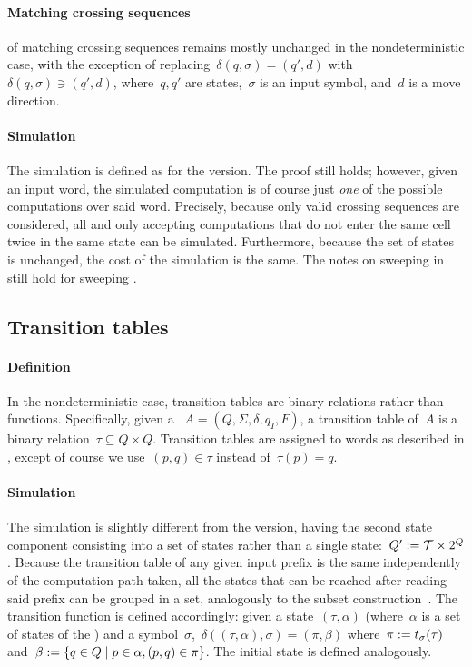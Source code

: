 \paragraph{Matching crossing sequences}  of matching crossing sequences remains mostly unchanged in the nondeterministic case, with the exception of replacing~$\delta(q,\sigma)=(q',d)$ with~$\delta(q,\sigma)\ni(q',d)$, where~$q,q'$ are states,~$\sigma$ is an input symbol, and~$d$ is a move direction.

\paragraph{Simulation} The simulation is defined as for the \TDFA version.
The proof still holds; however, given an input word, the simulated computation is of course just \emph{one} of the possible computations over said word.
Precisely, because only valid crossing sequences are considered, all and only accepting computations that do not enter the same cell twice in the same state can be simulated.
Furthermore, because the set of states is unchanged, the cost of the simulation is the same.
The notes on sweeping \TDFAs in  still hold for sweeping \TNFAs.


\easteregg{\thispagestyle{42}} %
\subsection{Transition tables}

\paragraph{Definition} In the nondeterministic case, transition tables are binary relations rather than functions.
Specifically, given a \TNFA~$A=(Q,\Sigma,\delta,q_I,F)$, a transition table of~$A$ is a binary relation~$\tau\subseteq Q\times Q$.
Transition tables are assigned to words as described in , except of course we use~$(p,q)\in\tau$ instead of~$\tau(p)=q$.

\paragraph{Simulation} The simulation is slightly different from the \TDFA version, having the second state component consisting into a set of states rather than a single state:~$Q':=\mathcal T\times2^{Q}$.
Because the transition table of any given input prefix is the same independently of the computation path taken, all the states that can be reached after reading said prefix can be grouped in a set, analogously to the subset construction~\cite{RabSco59,HopUll79}.
The transition function is defined accordingly: given a state~$(\tau,\alpha)$ (where~$\alpha$ is a set of states of the \TNFA) and a symbol~$\sigma$,~$\delta((\tau,\alpha),\sigma)=(\pi,\beta)$ where~$\pi:=t_\sigma(\tau)$ and~$\beta:=\{q\in Q\mid p\in\alpha, (p,q)\in\pi\}$.
The initial state is defined analogously.

